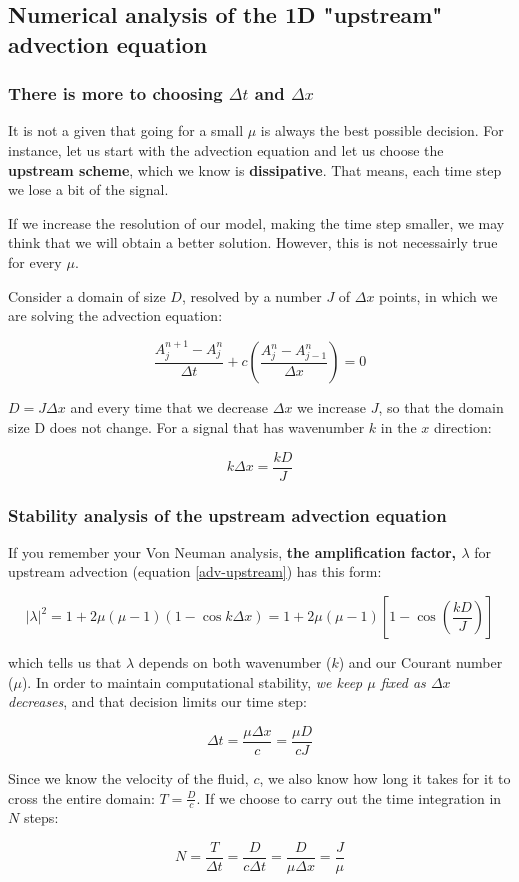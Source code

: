\documentclass[xcolor=dvipsnames]{beamer} %
\newcommand{\BSS}{ \begin{scriptsize}}
\newcommand{\ESS}{ \end{scriptsize}}
\begin{document}
\subsection{Numerical analysis of the 1D "upstream" advection equation}
\frame
{
	\frametitle{There is more to choosing $\Delta t$ and $\Delta x $}
\BSS
It is not a given that going for a small $\mu$ is always the best possible decision.
For instance, let us start with the advection equation and let us choose the \textbf{upstream scheme}, which we know is \textbf{dissipative}. That means, each time step we lose a bit of the signal.


If we increase the resolution of our model, making the time step smaller, we may think that we will obtain a better solution. However, this is not necessairly true for every $\mu$.

\medskip
Consider a domain of size $D$, resolved by a number $J$ of $\Delta x$ points, in which we are solving the advection equation:

\begin{equation}
\frac {A_j^{n+1}-A_j^{n}}{\Delta t} +c \left(  \frac {A_j^{n}-A_{j-1}^{n}}{\Delta x}  \right) = 0
\label{adv-upstream}
\end{equation}

$D=J \Delta x$ and every time that we decrease $\Delta x$ we increase $J$, so that the domain size D does not change. For a signal that has wavenumber $k$ in the $x$ direction:

\begin{equation}
k \Delta x = \frac {k D}{J}
\end{equation}

\ESS
}

\frame
{
	\frametitle{Stability analysis of the upstream advection equation}

\BSS
If you remember your Von Neuman analysis, \textbf{the amplification factor, $\lambda$} for upstream advection (equation \ref{adv-upstream})	has this form:

\begin{equation}
|\lambda|^2 = 1+2\mu(\mu-1)(1-\cos k \Delta x) = 1+2\mu(\mu-1)[1-\cos ( \frac {k D} {J})]
\end{equation}

which tells us that $\lambda$ depends on both wavenumber ($k$) and our Courant number ($\mu$). 
In order to maintain computational stability, \emph{we keep $\mu$ fixed as $\Delta x$ decreases}, and that decision limits our time step:

\begin{equation}
\Delta t = \frac {\mu \Delta x}{c} = \frac {\mu D}{cJ}
\end{equation}

Since we know the velocity of the fluid, $c$, we also know how long it takes for it to cross the entire domain: $T=\frac {D}{c}$. If we choose to carry out the time integration in $N$ steps:

\begin{equation}
N= \frac {T}{\Delta t} = \frac {D}{c \Delta t} = \frac {D}{\mu \Delta x} = \frac {J}{\mu}
\end{equation}

\ESS
}	
\end{document}
